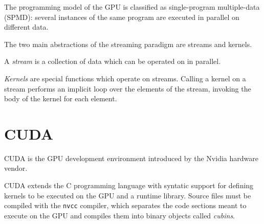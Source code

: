 The programming model of the GPU is classified as single-program multiple-data (SPMD):
several instances of the same program are executed in parallel
on different data.

The two main abstractions of the streaming paradigm are streams and kernels.

A \emph{stream} is a collection of data which can be operated on in parallel.

\emph{Kernels} are special functions which operate on streams.
Calling a kernel on a stream
performs an implicit loop over the elements of the stream,
invoking the body of the kernel for each element.


\section{CUDA}

CUDA is the GPU development environment
introduced by the Nvidia hardware vendor.

CUDA extends the C programming language
with syntatic support for defining kernels
to be executed on the GPU
and a runtime library.
Source files must be compiled with the \texttt{nvcc} compiler,
which separates the code sections meant to execute on the GPU
and compiles them into binary objects called \emph{cubins}.

